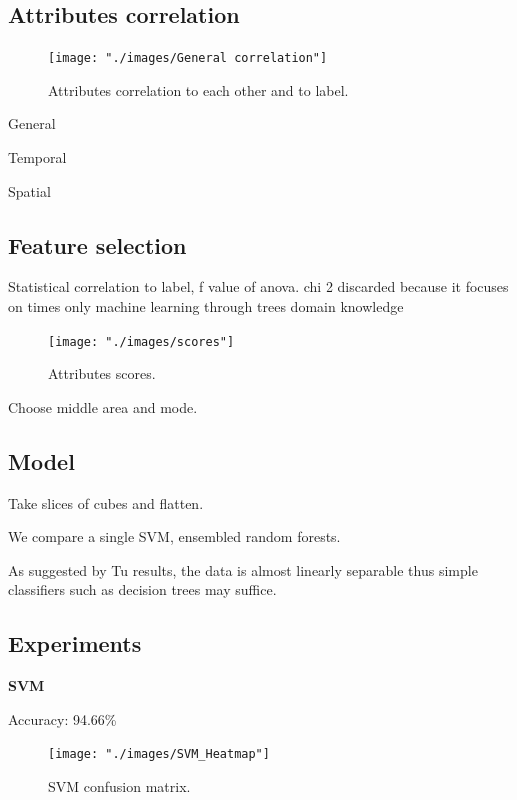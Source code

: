 \documentclass{article}
\begin{document}
\subsection{Attributes correlation}

\begin{figure}[H]
  \centering
  \texttt{[image: "./images/General correlation"]}
  \caption{Attributes correlation to each other and to label.}
  \label{fig:classification/correlation}
\end{figure}

General

Temporal

Spatial

\subsection{Feature selection}
Statistical correlation to label, f value of anova. chi 2 discarded because it focuses on times only
machine learning through trees
domain knowledge

\begin{figure}[H]
  \centering
  \texttt{[image: "./images/scores"]}
  \caption{Attributes scores.}
  \label{fig:classification/scores}
\end{figure}

Choose middle area and mode. 

\subsection{Model}
Take slices of cubes and flatten. 

We compare a single SVM, ensembled random forests. 

As suggested by Tu \cite{tu2016impact} results, the data is almost linearly separable thus simple classifiers such as decision trees may suffice. 



\subsection{Experiments}

\textbf{SVM}

Accuracy: 94.66\%

\begin{figure}[H]
  \centering
  \texttt{[image: "./images/SVM\_Heatmap"]}
  \caption{SVM confusion matrix.}
  \label{fig:classification/svm_confusion}
\end{figure}
  
\end{document}
